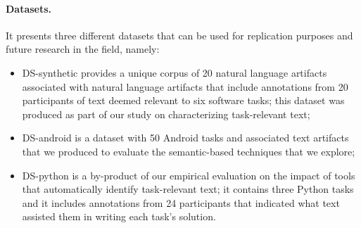 
\paragraph{\textbf{Datasets.}} 

It presents three different datasets that can be used for replication purposes and future research in the field, namely:
    
\begin{itemize}
    \item \acs{DS-synthetic} provides a unique corpus of 20 natural language artifacts associated
    with natural language artifacts that include annotations from 20 participants of text deemed relevant to six software tasks; this dataset was produced as part of our study on characterizing task-relevant text;
    
    \item \acs{DS-android} is a dataset with 50 Android tasks and associated text artifacts 
    that we produced to evaluate the semantic-based techniques that we explore;

    \item \acs{DS-python} is a by-product of our empirical evaluation on the impact of tools that automatically identify task-relevant text;
    it contains three Python tasks and it includes annotations from 24 participants that indicated what text assisted them in writing each task's solution.
\end{itemize}